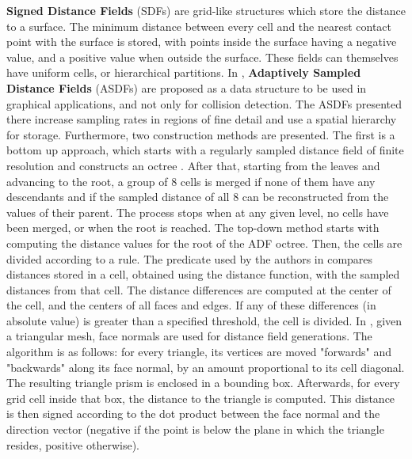 \textbf{Signed Distance Fields} (SDFs) are grid-like structures which store the distance to a surface. The minimum distance between every cell and the nearest contact point with the surface is stored, with points inside the surface having a negative value, and a positive value when outside the surface. These fields can themselves have uniform cells, or hierarchical partitions. In \citep{fris00}, \textbf{Adaptively Sampled Distance Fields} (ASDFs) are proposed as a data structure to be used in graphical applications, and not only for collision detection. The ASDFs presented there increase sampling rates in regions of fine detail and use a spatial hierarchy for storage. Furthermore, two construction methods are presented. The first is a bottom up approach, which starts with a regularly sampled distance field of finite resolution and constructs an octree \citep{fris00}. After that, starting from the leaves and advancing to the root, a group of 8 cells is merged if none of them have any descendants and if the sampled distance of all 8 can be reconstructed from the values of their parent. The process stops when at any given level, no cells have been merged, or when the root is reached. The top-down method starts with computing the distance values for the root of the ADF octree. Then, the cells are divided according to a rule. The predicate used by the authors in \citep{fris00} compares distances stored in a cell, obtained using the distance function, with the sampled distances from that cell. The distance differences are computed at the center of the cell, and the centers of all faces and edges. If any of these differences (in absolute value) is greater than a specified threshold, the cell is divided. In \citep{fsg03}, given a triangular mesh, face normals are used for distance field generations. The algorithm is as follows: for every triangle, its vertices are moved "forwards" and "backwards" along its face normal, by an amount proportional to its cell diagonal. The resulting triangle prism is enclosed in a bounding box. Afterwards, for every grid cell inside that box, the distance to the triangle is computed. This distance is then signed according to the dot product between the face normal and the direction vector (negative if the point is below the plane in which the triangle resides, positive otherwise).


